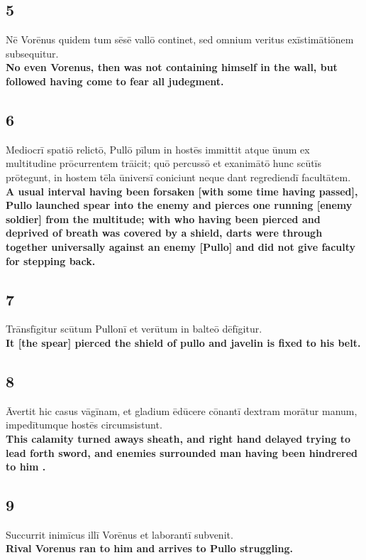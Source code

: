 \documentclass{article}
\begin{document}
\subsection*{5}
Nē Vorēnus quidem tum sēsē vallō continet, sed omnium veritus exīstimātiōnem subsequitur. \\
\textbf{No even Vorenus, then was not containing himself in the wall, but followed having come to fear all judegment.}

\subsection*{6}
Mediocrī spatiō relictō, Pullō pīlum in hostēs immittit atque ūnum ex multitudine prōcurrentem trāicit; quō percussō et exanimātō hunc scūtīs prōtegunt, in hostem tēla ūniversī coniciunt neque dant regrediendī facultātem. \\
\textbf{A usual interval having been forsaken [with some time having passed], Pullo launched spear into the enemy and pierces one running [enemy soldier] from the multitude; with who having been pierced and deprived of breath was covered by a shield, darts were through together universally against an enemy [Pullo] and did not give faculty for stepping back.}

\subsection*{7}
Trānsfīgitur scūtum Pullonī et verūtum in balteō dēfīgitur.\\
\textbf{It [the spear] pierced the shield of pullo and javelin is fixed to his belt.} 

\subsection*{8}
Āvertit hic casus vāgīnam, et gladium ēdūcere cōnantī dextram morātur manum, impedītumque hostēs circumsistunt. \\
\textbf{This calamity turned aways sheath, and right hand delayed trying to lead forth sword, and enemies surrounded man having been hindrered to him .}

\subsection*{9}
Succurrit inimīcus illī Vorēnus et laborantī subvenit. \\
\textbf{Rival Vorenus ran to him and arrives to Pullo struggling.}
\end{document}
